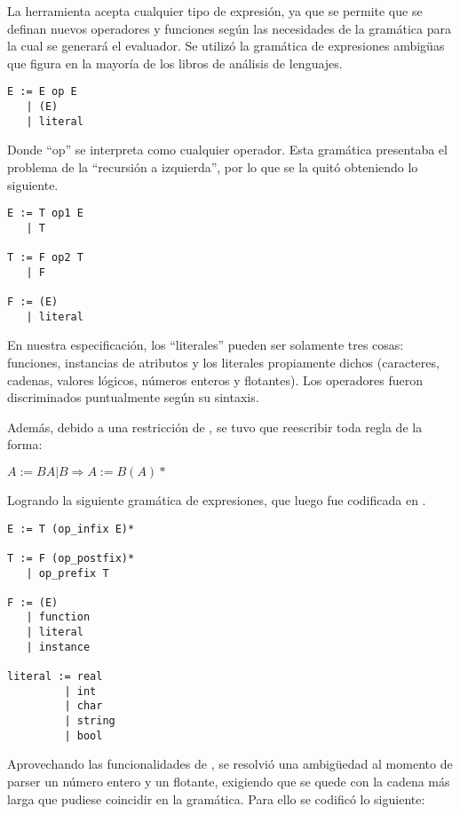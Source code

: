 La herramienta acepta cualquier tipo de expresión, ya que se permite que se definan nuevos operadores y funciones según las necesidades de la gramática para la cual se generará el evaluador. Se utilizó la gramática de expresiones ambigüas que figura en la mayoría de los libros de análisis de lenguajes.

\begin{lstlisting}[backgroundcolor=\color{white}]
E := E op E
   | (E)
   | literal
\end{lstlisting}

Donde ``op'' se interpreta como cualquier operador. Esta gramática presentaba el problema de la ``recursión a izquierda'', por lo que se la quitó obteniendo lo siguiente.

\begin{lstlisting}[backgroundcolor=\color{white}]
E := T op1 E
   | T

T := F op2 T
   | F

F := (E)
   | literal
\end{lstlisting}

En nuestra especificación, los ``literales'' pueden ser solamente tres cosas: funciones, instancias de atributos y los literales propiamente dichos (caracteres, cadenas, valores lógicos, números enteros y flotantes). Los operadores fueron discriminados puntualmente según su sintaxis.

Además, debido a una restricción de \spirit, se tuvo que reescribir toda regla de la forma:

\begin{center}\textbf{\large{$ A := B A | B  \Rightarrow  A := B (A)* $}}\end{center}

Logrando la siguiente gramática de expresiones, que luego fue codificada en \spirit.

\begin{lstlisting}[backgroundcolor=\color{white}]
E := T (op_infix E)*

T := F (op_postfix)*
   | op_prefix T

F := (E)
   | function
   | literal
   | instance

literal := real
         | int
         | char
         | string
         | bool
\end{lstlisting}

Aprovechando las funcionalidades de \spirit, se resolvió una ambigüedad al momento de parser un número entero y un flotante, exigiendo que se quede con la cadena más larga que pudiese coincidir en la gramática. Para ello se codificó lo siguiente:

